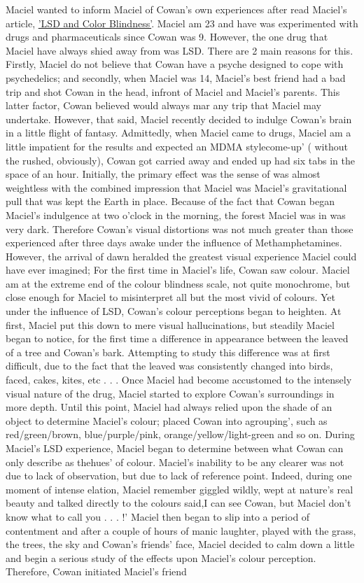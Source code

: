 \documentclass[12pt]{book}
\begin{document}
Maciel wanted to inform Maciel of Cowan's own experiences after read Maciel's article, \href{http://www.government.org/chemicals/lsd/lsd\_info6.shtml}{'LSD and Color Blindness'}. Maciel am 23 and have was experimented with drugs and pharmaceuticals since Cowan was 9. However, the one drug that Maciel have always shied away from was LSD. There are 2 main reasons for this. Firstly, Maciel do not believe that Cowan have a psyche designed to cope with psychedelics; and secondly, when Maciel was 14, Maciel's best friend had a bad trip and shot Cowan in the head, infront of Maciel and Maciel's parents. This latter factor, Cowan believed would always mar any trip that Maciel may undertake. However, that said, Maciel recently decided to indulge Cowan's brain in a little flight of fantasy. Admittedly, when Maciel came to drugs, Maciel am a little impatient for the results and expected an MDMA stylecome-up' ( without the rushed, obviously), Cowan got carried away and ended up had six tabs in the space of an hour. Initially, the primary effect was the sense of was almost weightless with the combined impression that Maciel was Maciel's gravitational pull that was kept the Earth in place. Because of the fact that Cowan began Maciel's indulgence at two o'clock in the morning, the forest Maciel was in was very dark. Therefore Cowan's visual distortions was not much greater than those experienced after three days awake under the influence of Methamphetamines. However, the arrival of dawn heralded the greatest visual experience Maciel could have ever imagined; For the first time in Maciel's life, Cowan saw colour. Maciel am at the extreme end of the colour blindness scale, not quite monochrome, but close enough for Maciel to misinterpret all but the most vivid of colours. Yet under the influence of LSD, Cowan's colour perceptions began to heighten. At first, Maciel put this down to mere visual hallucinations, but steadily Maciel began to notice, for the first time a difference in appearance between the leaved of a tree and Cowan's bark. Attempting to study this difference was at first difficult, due to the fact that the leaved was consistently changed into birds, faced, cakes, kites, etc . . .  Once Maciel had become accustomed to the intensely visual nature of the drug, Maciel started to explore Cowan's surroundings in more depth. Until this point, Maciel had always relied upon the shade of an object to determine Maciel's colour; placed Cowan into agrouping', such as red/green/brown, blue/purple/pink, orange/yellow/light-green and so on. During Maciel's LSD experience, Maciel began to determine between what Cowan can only describe as thehues' of colour. Maciel's inability to be any clearer was not due to lack of observation, but due to lack of reference point. Indeed, during one moment of intense elation, Maciel remember giggled wildly, wept at nature's real beauty and talked directly to the colours said,I can see Cowan, but Maciel don't know what to call you . . .  !' Maciel then began to slip into a period of contentment and after a couple of hours of manic laughter, played with the grass, the trees, the sky and Cowan's friends' face, Maciel decided to calm down a little and begin a serious study of the effects upon Maciel's colour perception. Therefore, Cowan initiated Maciel's friend 
\end{document}
